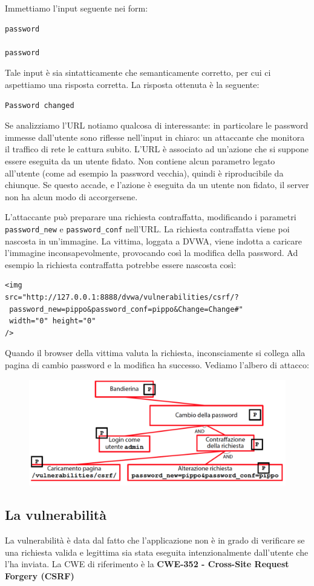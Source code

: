 Immettiamo l'input seguente nei form:
\begin{lstlisting}
password

password
\end{lstlisting}
Tale input è sia sintatticamente che semanticamente corretto, per cui ci aspettiamo una risposta corretta. La risposta ottenuta è la seguente:
\begin{lstlisting}
Password changed
\end{lstlisting}
Se analizziamo l'URL notiamo qualcosa di interessante: in particolare le password immesse dall'utente sono riflesse nell'input in chiaro: un attaccante che monitora il traffico di rete le cattura subito. L'URL è associato ad un'azione che si suppone essere eseguita da un utente fidato. Non contiene alcun parametro legato all'utente (come ad esempio la password vecchia), quindi è riproducibile da chiunque. Se questo accade, e l'azione è eseguita da un utente non fidato, il server non ha alcun modo di accorgersene. 

L'attaccante può preparare una richiesta contraffatta, modificando i parametri \texttt{password\_new} e \texttt{password\_conf} nell'URL. La richiesta contraffatta viene poi nascosta in un'immagine. La vittima, loggata a DVWA, viene indotta a caricare l'immagine inconsapevolmente, provocando così la modifica della password. Ad esempio la richiesta contraffatta potrebbe essere nascosta così:
\begin{lstlisting}
<img
src="http://127.0.0.1:8888/dvwa/vulnerabilities/csrf/?
 password_new=pippo&password_conf=pippo&Change=Change#"
 width="0" height="0"
/>
\end{lstlisting}
Quando il browser della vittima valuta la richiesta, inconsciamente si collega alla pagina di cambio password e la modifica ha successo. Vediamo l'albero di attacco:

\begin{figure}[hbpt!]
    \centering
    \includegraphics[width= 0.7 \textwidth]{./Images/cap6/6.12.png}
\end{figure}
\FloatBarrier

\subsection{La vulnerabilità}
La vulnerabilità è data dal fatto che l'applicazione non è in grado di verificare se una richiesta valida e legittima sia stata eseguita intenzionalmente dall'utente che l'ha inviata. La CWE di riferimento è la \textbf{CWE-352 - Cross-Site Request Forgery (CSRF)}

